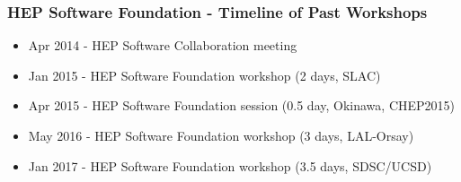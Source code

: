 \begin{frame}
\frametitle{HEP Software Foundation - Timeline of Past Workshops}

\begin{itemize}
\item Apr 2014 - HEP Software Collaboration meeting
\item Jan 2015 - HEP Software Foundation workshop (2 days, SLAC)
\item Apr 2015 - HEP Software Foundation session (0.5 day, Okinawa, CHEP2015)
\item May 2016 - HEP Software Foundation workshop (3 days, LAL-Orsay)
\item Jan 2017 - HEP Software Foundation workshop (3.5 days, SDSC/UCSD)
\end{itemize}

\end{frame}


